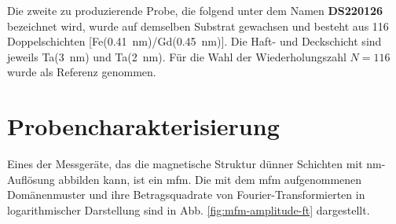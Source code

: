 \noindent
Die zweite zu produzierende Probe, die folgend unter dem Namen \textbf{DS220126} bezeichnet wird, wurde auf demselben Substrat gewachsen und besteht aus 116 Doppelschichten [Fe(\SI{0.41}{\nano\meter})/Gd(\SI{0.45}{\nano\meter})]. Die Haft- und Deckschicht sind jeweils Ta(\SI{3}{\nano\meter}) und Ta(\SI{2}{\nano\meter}). Für die Wahl der Wiederholungszahl $N=116$ wurde \cite[Abschnitt „Sample Preparation“]{tripathi_dichroic_2011} als Referenz genommen.

\section{Probencharakterisierung}
Eines der Messgeräte, das die magnetische Struktur dünner Schichten mit \si{\nano\meter}-Auflösung abbilden kann, ist ein \gls{mfm}. Die mit dem \gls{mfm} aufgenommenen Domänenmuster und ihre Betragsquadrate von Fourier-Transformierten in logarithmischer Darstellung sind in Abb. \ref{fig:mfm-amplitude-ft} dargestellt.
